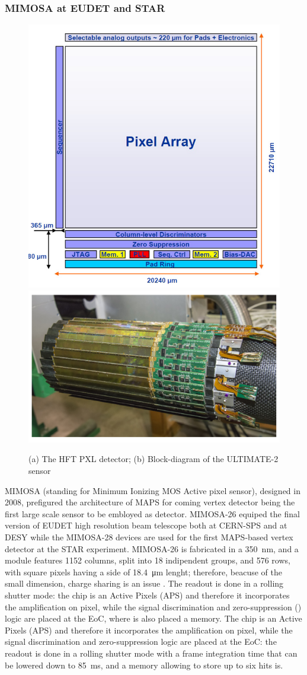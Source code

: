     \subsubsection{MIMOSA at EUDET and STAR}
        \begin{figure}    
        \centering
            \includegraphics[width=.49\linewidth]{figures/pixel_detectors_usage/MIMOSA.png}
            \includegraphics[width=.49\linewidth]{figures/pixel_detectors_usage/STAR.png}
            \caption{(a) The HFT PXL detector; (b) Block-diagram of the ULTIMATE-2 sensor}
            \label{fig:}
        \end{figure}
        MIMOSA \cite{MIMOSA}\cite{MIMOSA26} (standing for Minimum Ionizing MOS Active pixel sensor), designed in 2008, prefigured the architecture of MAPS for coming vertex detector being the first large scale sensor to be embloyed as detector. MIMOSA-26 equiped the final version of EUDET high resolution  beam telescope both at CERN-SPS and at DESY while the MIMOSA-28 devices are used for the first MAPS-based vertex detector at the STAR experiment.
        MIMOSA-26 is fabricated in a \SI{350}{nm}, and a module features 1152 columns, split into 18 indipendent groups, and 576 rows, with square pixels having a side of \SI{18.4}{\um} lenght; therefore, beacuse of the small dimension, charge sharing is an issue . 
        The readout is done in a rolling shutter mode: the chip is an Active Pixels (APS) and therefore it incorporates the amplification on pixel, while the signal discrimination and zero-suppression () logic are placed at the EoC, where is also placed a memory.
        The chip is an Active Pixels (APS) and therefore it incorporates the amplification on pixel, while the signal discrimination and zero-suppression logic are placed at the EoC: the readout is done in a rolling shutter mode with a frame integration time that can be lowered down to \SI{85}{ms}, and a memory allowing to store up to six hits is. 

